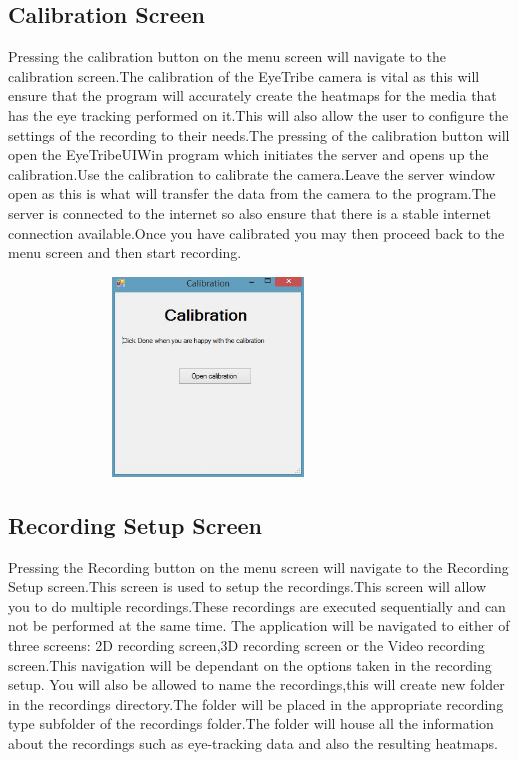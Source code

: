 \subsection{Calibration Screen}
Pressing the calibration button on the menu screen will navigate to the calibration screen.The calibration of the EyeTribe camera is vital as this will ensure that the program will accurately create the heatmaps for the media that has the eye tracking performed on it.This will also allow the user to configure the settings of the recording to their needs.The pressing of the calibration button will open the EyeTribeUIWin program which initiates the server and opens up the calibration.Use the calibration to calibrate the camera.Leave the server window open as this is what will transfer the data from the camera to the program.The server is connected to the internet so also ensure that there is a stable internet connection available.Once you have calibrated you may then proceed back to the menu screen and then start recording.

\includegraphics[width=400px,height=200px]{./Images/CalibrationStarter.JPG}

\subsection{Recording Setup Screen}
Pressing the Recording button on the menu screen will navigate to the Recording Setup screen.This screen is used to setup the recordings.This screen will allow you to do multiple recordings.These recordings are executed sequentially and can not be performed at the same time.
The application will be navigated to either of three screens: 2D recording screen,3D recording screen or the Video recording screen.This navigation will be dependant on the options taken in the recording setup.
You will also be allowed to name the recordings,this will create new folder in the recordings directory.The folder will be placed in the appropriate recording type subfolder of the recordings folder.The folder will house all the information about the recordings such as eye-tracking data and also the resulting heatmaps.

